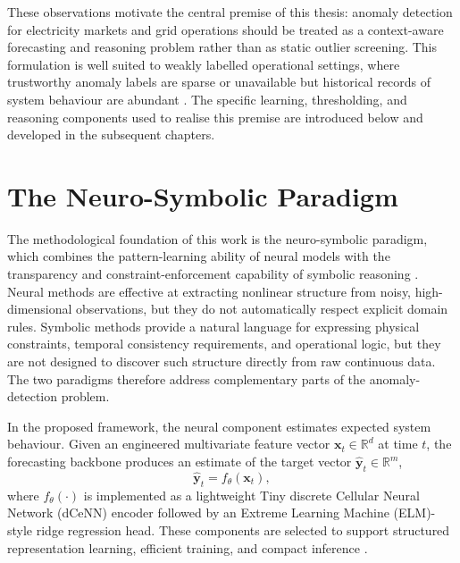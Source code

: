 These observations motivate the central premise of this thesis: anomaly detection
for electricity markets and grid operations should be treated as a context-aware
forecasting and reasoning problem rather than as static outlier screening. This
formulation is well suited to weakly labelled operational settings, where trustworthy
anomaly labels are sparse or unavailable but historical records of system behaviour
are abundant \cite{chandola2009anomaly,shafer2008tutorial}. The specific learning,
thresholding, and reasoning components used to realise this premise are introduced
below and developed in the subsequent chapters.



\section{The Neuro-Symbolic Paradigm}

The methodological foundation of this work is the neuro-symbolic paradigm, which combines the pattern-learning ability of neural models with the transparency and constraint-enforcement capability of symbolic reasoning \cite{garcez2009neural,gebser2012answer,gebser2019multi}. Neural methods are effective at extracting nonlinear structure from noisy, high-dimensional observations, but they do not automatically respect explicit domain rules. Symbolic methods provide a natural language for expressing physical constraints, temporal consistency requirements, and operational logic, but they are not designed to discover such structure directly from raw continuous data. The two paradigms therefore address complementary parts of the anomaly-detection problem.

In the proposed framework, the neural component estimates expected system behaviour.
Given an engineered multivariate feature vector
$\mathbf{x}_t \in \mathbb{R}^{d}$ at time $t$, the forecasting backbone produces
an estimate of the target vector $\hat{\mathbf{y}}_t \in \mathbb{R}^{m}$,
\begin{equation}
\hat{\mathbf{y}}_t = f_{\theta}(\mathbf{x}_t),
\label{eq:intro_forecast}
\end{equation}
where $f_{\theta}(\cdot)$ is implemented as a lightweight Tiny discrete Cellular
Neural Network (dCeNN) encoder followed by an Extreme Learning Machine
(ELM)-style ridge regression head. These components are selected to support
structured representation learning, efficient training, and compact inference
\cite{chua1988cellular,huang2006extreme,hoerl1970ridge}.

